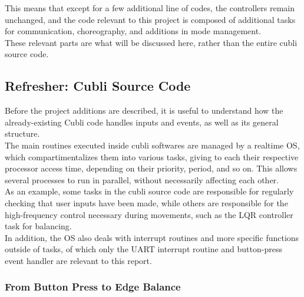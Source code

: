 This means that except for a few additional line of codes, the controllers remain unchanged, and the code relevant to this project is composed of additional tasks for communication, choreography, and additions in mode management.\\

These relevant parts are what will be discussed here, rather than the entire cubli source code.

\subsection{Refresher: Cubli Source Code }

Before the project additions are described, it is useful to understand how the already-existing Cubli code handles inputs and events, as well as its general structure.\\

The main routines executed inside cubli softwares are managed by a realtime OS, which compartimentalizes them into various tasks, giving to each their respective processor access time, depending on their priority, period, and so on. This allows several processes to run in parallel, without necessarily affecting each other.\\

As an example, some tasks in the cubli source code are responsible for regularly checking that user inputs have been made, while others are responsible for the high-frequency control necessary during movements, such as the LQR controller task for balancing.\\

In addition, the OS also deals with interrupt routines and more specific functions outside of tasks, of which only the UART interrupt routine and button-press event handler are relevant to this report.\\

\subsubsection{From Button Press to Edge Balance}

